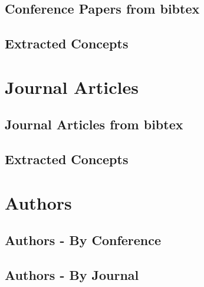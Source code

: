 \documentclass[a4paper]{article}
\begin{document}
\clearpage
\subsection{Conference Papers from bibtex}


\clearpage
\subsection{Extracted Concepts}


%

\clearpage
\section{Journal Articles}

\clearpage
\subsection{Journal Articles from bibtex}



\clearpage
\subsection{Extracted Concepts}


%

\clearpage
\section{Authors}



\subsection{Authors - By Conference}



\subsection{Authors - By Journal}
\end{document}
